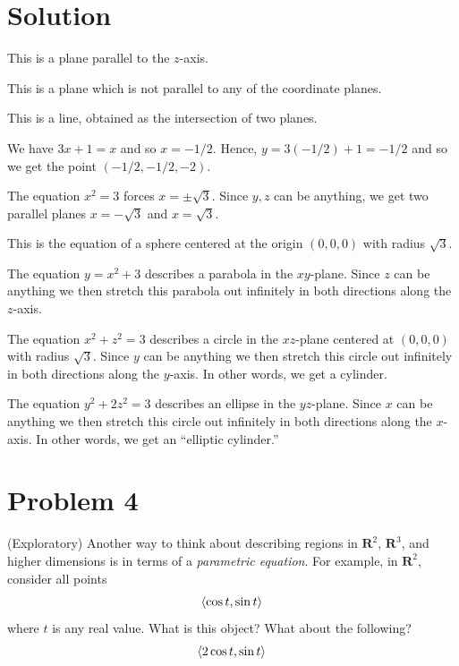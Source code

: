 \documentclass[11pt]{article}
\renewcommand{\R}{\mathbf{R}}
\begin{document}
\section*{Solution}
\begin{enum}{\alph}
\item This is a plane parallel to the $z$-axis.

\item This is a plane which is not parallel to any of the coordinate planes.

\item This is a line, obtained as the intersection of two planes.

\item We have $3x+1=x$ and so $x=-1/2$. Hence, $y=3(-1/2)+1=-1/2$ and so we get the point $(-1/2,-1/2,-2)$.

\item The equation $x^2=3$ forces $x=\pm\sqrt{3}$. Since $y,z$ can be anything, we get two parallel planes $x=-\sqrt{3}$ and $x=\sqrt{3}$.

\item This is the equation of a sphere centered at the origin $(0,0,0)$ with radius $\sqrt{3}$.

\item The equation $y=x^2+3$ describes a parabola in the $xy$-plane. Since $z$ can be anything we then stretch this parabola out infinitely in both directions along the $z$-axis.

\item The equation $x^2+z^2=3$ describes a circle in the $xz$-plane centered at $(0,0,0)$ with radius $\sqrt{3}$. Since $y$ can be anything we then stretch this circle out infinitely in both directions along the $y$-axis. In other words, we get a cylinder.

\item The equation $y^2+2z^2=3$ describes an ellipse in the $yz$-plane. Since $x$ can be anything we then stretch this circle out infinitely in both directions along the $x$-axis. In other words, we get an ``elliptic cylinder.''
\end{enum}

\section*{Problem 4}
(Exploratory) Another way to think about describing regions in $\R^2$, $\R^3$, and higher dimensions is in terms of a \emph{parametric equation}. For example, in $\R^2$, consider all points 
$$\!\left\langle\cos t,\sin t\right\rangle$$ 
where $t$ is any real value. What is this object? What about the following? 
$$\!\left\langle2\cos t,\sin t\right\rangle$$
\end{document}
